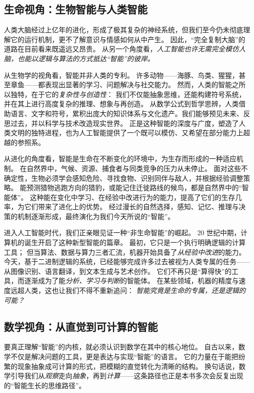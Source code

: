 \subsection{生命视角：生物智能与人类智能}

人类大脑经过上亿年的进化，形成了极其复杂的神经系统，但我们至今仍未彻底理解它的运行机制，更不了解意识与情感如何从中产生。  
因此，“完全复制大脑”的道路在目前看来既遥远又昂贵。  
从另一个角度看，\emph{人工智能也许无需完全模仿人脑，也能以逻辑与算法的方式抵达“智能”的彼岸。}  

从生物学的视角看，智能并非人类的专利。  
许多动物——海豚、鸟类、猩猩，甚至章鱼——都表现出显著的学习、问题解决与社交能力。
然而，人类的智能之所以独特，在于它的\emph{复杂性与创造性}：  
我们不仅能抽象思维，还能构建符号系统，并在其上进行高度复杂的推理、想象与再创造。  
从数学公式到哲学思辨，人类借助语言、文字和符号，累积出庞大的知识体系与文化遗产。我们能够预见未来、反思过去，并以科学与技术改造现实世界。
正是这种智能的深度与广度，塑造了人类文明的独特进程，也为人工智能提供了一个既可以模仿、又希望在部分能力上超越的参照系。  

从进化的角度看，智能是生命在不断变化的环境中，为生存而形成的一种适应机制。  
在自然界中，气候、资源、捕食者与同类竞争的压力从未停止。  
面对这些不确定性，生物必须学会感知危险、寻找食物、识别同伴与敌人，并根据经验调整策略。
能预测猎物逃跑方向的猎豹，或能记住迁徙路线的候鸟，都是自然界中的“智能体”。  
这种能在变化中学习、在经验中改进行为的能力，提高了它们的生存几率，为它们带来了进化上的优势。
经过漫长的自然选择，感知、记忆、推理与决策的机制逐渐形成，最终演化为我们今天所说的“智能”。

进入人工智能时代，我们正亲眼见证一种“非生命智能”的崛起。  
20 世纪中期，计算机的诞生开启了这种新型智能的篇章。  
最初，它只是一个执行明确逻辑的计算工具；  
但当算法、数据与算力三者汇流，机器开始具备了\emph{从经验中改进}的能力。  
今天，基于二进制逻辑的系统，已经能够完成许多过去被视为人类专属的任务——从图像识别、语言翻译，到文本生成与艺术创作。
它们不再只是“算得快”的工具，而逐渐成为了能\emph{分析、学习与判断}的智能体。  
在某些领域，机器的精度与速度远超人类，这也让我们不得不重新追问：  
\emph{智能究竟是生命的专属，还是逻辑的可能？}  

\subsection{数学视角：从直觉到可计算的智能}
要真正理解“智能”的内核，就必须认识到数学在其中的核心地位。
自古以来，数学不仅是解决问题的工具，更是表达与实现“智能”的语言。
它的力量在于能把纷繁的现象抽象成可计算的形式，把模糊的直觉转化为清晰的结构。
换句话说，数学引导我们从\emph{观察}走向\emph{抽象}，再到\emph{计算}——这条路径也正是本书多次会反复出现的“智能生长的思维路径”。  

